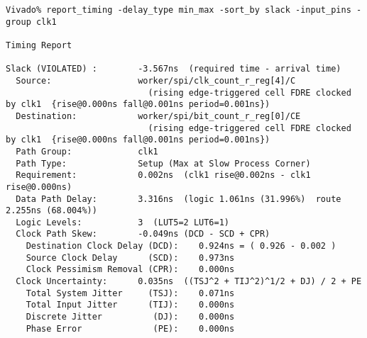 \documentclass{article}
\begin{document}
\begin{lstlisting}
Vivado% report_timing -delay_type min_max -sort_by slack -input_pins -group clk1

Timing Report

Slack (VIOLATED) :        -3.567ns  (required time - arrival time)
  Source:                 worker/spi/clk_count_r_reg[4]/C
                            (rising edge-triggered cell FDRE clocked by clk1  {rise@0.000ns fall@0.001ns period=0.001ns})
  Destination:            worker/spi/bit_count_r_reg[0]/CE
                            (rising edge-triggered cell FDRE clocked by clk1  {rise@0.000ns fall@0.001ns period=0.001ns})
  Path Group:             clk1
  Path Type:              Setup (Max at Slow Process Corner)
  Requirement:            0.002ns  (clk1 rise@0.002ns - clk1 rise@0.000ns)
  Data Path Delay:        3.316ns  (logic 1.061ns (31.996%)  route 2.255ns (68.004%))
  Logic Levels:           3  (LUT5=2 LUT6=1)
  Clock Path Skew:        -0.049ns (DCD - SCD + CPR)
    Destination Clock Delay (DCD):    0.924ns = ( 0.926 - 0.002 ) 
    Source Clock Delay      (SCD):    0.973ns
    Clock Pessimism Removal (CPR):    0.000ns
  Clock Uncertainty:      0.035ns  ((TSJ^2 + TIJ^2)^1/2 + DJ) / 2 + PE
    Total System Jitter     (TSJ):    0.071ns
    Total Input Jitter      (TIJ):    0.000ns
    Discrete Jitter          (DJ):    0.000ns
    Phase Error              (PE):    0.000ns


\end{lstlisting}
\end{document}
